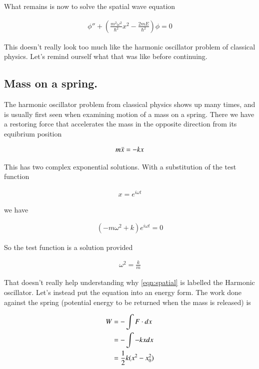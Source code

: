 \documentclass{article}
\begin{document}
What remains is now to solve the spatial wave equation

\begin{align}\label{eqn:spatial}
\phi'' + \left( \frac{m^2 \omega^2}{\hbar^2} x^2 - \frac{2m E}{\hbar^2}\right) \phi = 0
\end{align}

This doesn't really look too much like the harmonic oscillator problem of classical physics.  Let's remind ourself
what that was like before continuing.

\subsection{ Mass on a spring. }

The harmonic oscillator problem from classical physics
shows up many times, and is usually first seen when examining motion
of a mass on a spring.  There we have a restoring force that accelerates the
mass in the opposite direction from its equibrium position

\begin{align}
m \ddot{x} = -k x
\end{align}

This has two complex exponential solutions.  With a substitution of the test function

\begin{align*}
x = e^{i \omega t}
\end{align*}

we have

\begin{align*}
(-m \omega^2 + k) e^{i \omega t} = 0
\end{align*}

So the test function is a solution provided

\begin{align*}
\omega^2 = \frac{k}{m}
\end{align*}

That doesn't really help understanding why \ref{eqn:spatial} is labelled the Harmonic oscillator.  Let's instead put the equation into an energy form.  The work done against the spring
(potential energy to be returned when the mass is released) is

\begin{align*}
W 
&= - \int F \cdot dx \\
&= - \int -kx dx \\
&= \frac{1}{2} k (x^2 - x_0^2)
\end{align*}
\end{document}

